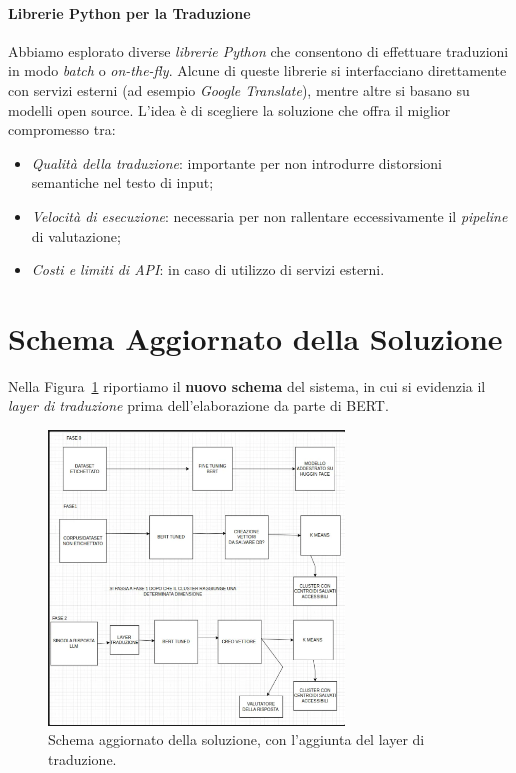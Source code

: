 \documentclass[a4paper,12pt]{article}
\begin{document}
\paragraph{Librerie Python per la Traduzione}
Abbiamo esplorato diverse \emph{librerie Python} che consentono di effettuare traduzioni in modo \emph{batch} o \emph{on-the-fly}. Alcune di queste librerie si interfacciano direttamente con servizi esterni (ad esempio \emph{Google Translate}), mentre altre si basano su modelli open source. L’idea è di scegliere la soluzione che offra il miglior compromesso tra:
\begin{itemize}
    \item \emph{Qualità della traduzione}: importante per non introdurre distorsioni semantiche nel testo di input;
    \item \emph{Velocità di esecuzione}: necessaria per non rallentare eccessivamente il \emph{pipeline} di valutazione;
    \item \emph{Costi e limiti di API}: in caso di utilizzo di servizi esterni.
\end{itemize}

\section*{Schema Aggiornato della Soluzione}
Nella Figura~\ref{fig:flusso2} riportiamo il \textbf{nuovo schema} del sistema, in cui si evidenzia il \emph{layer di traduzione} prima dell’elaborazione da parte di BERT.

\begin{figure}[h!]
    \centering
    \includegraphics[width=0.7\textwidth]{image.png} %
    \caption{Schema aggiornato della soluzione, con l’aggiunta del layer di traduzione.}
    \label{fig:flusso2}
\end{figure}
\end{document}
